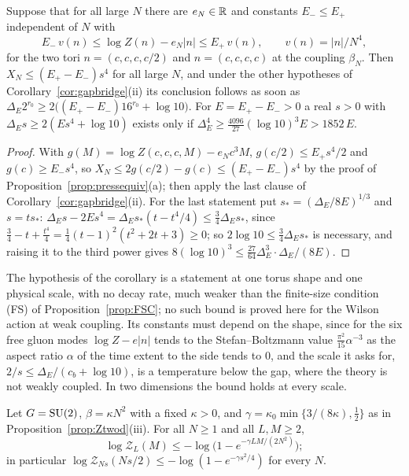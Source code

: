 \begin{corollary}\label{cor:pressuv}
Suppose that for all large $N$ there are $e_N\in\mathbb{R}$ and constants $E_-\le E_+$
independent of $N$ with
\[
E_-\,v(n)\le\log Z(n)-e_N|n|\le E_+\,v(n),\qquad v(n)=|n|/N^4,
\]
for the two tori $n=(c,c,c,c/2)$ and $n=(c,c,c,c)$ at the coupling $\beta_N$.
Then $X_N\le(E_+-E_-)s^4$ for all large $N$, and under the other hypotheses of
Corollary~\ref{cor:gapbridge}(ii) its conclusion follows as soon as $\Delta_E
2^{r_0}\ge2\bigl((E_+-E_-)16^{r_0}+\log10\bigr)$. For $E=E_+-E_->0$ a real
$s>0$ with $\Delta_Es\ge2(Es^4+\log10)$ exists only if $\Delta_E^4\ge\frac
{4096}{27}(\log10)^3E>1852\,E$.
\end{corollary}

\begin{proof}
With $g(M)=\log Z(c,c,c,M)-e_Nc^3M$, $g(c/2)\le E_+s^4/2$ and $g(c)\ge E_-s^4$,
so $X_N\le2g(c/2)-g(c)\le(E_+-E_-)s^4$ by the proof of
Proposition~\ref{prop:pressequiv}(a); then apply the last clause of
Corollary~\ref{cor:gapbridge}(ii). For the last statement put $s_*=(\Delta_E/
8E)^{1/3}$ and $s=ts_*$: $\Delta_Es-2Es^4=\Delta_Es_*(t-t^4/4)\le\frac34
\Delta_Es_*$, since $\frac34-t+\frac{t^4}4=\frac14(t-1)^2(t^2+2t+3)\ge0$; so
$2\log10\le\frac34\Delta_Es_*$ is necessary, and raising it to the third power
gives $8(\log10)^3\le\frac{27}{64}\Delta_E^3\cdot\Delta_E/(8E)$.
\end{proof}

The hypothesis of the corollary is a statement at one torus shape and one
physical scale, with no decay rate, much weaker than the finite-size
condition (FS) of Proposition~\ref{prop:FSC}; no such bound is proved here
for the Wilson action at weak coupling. Its constants must depend on the
shape, since for the six free gluon modes $\log Z-e|n|$ tends to the
Stefan--Boltzmann value $\frac{\pi^2}{15}\alpha^{-3}$ as the aspect ratio
$\alpha$ of the time extent to the side tends to $0$, and the scale
it asks for, $2/s\le\Delta_E/(c_b+\log10)$, is a temperature below the gap,
where the theory is not weakly coupled. In two dimensions the bound holds at
every scale.

\begin{proposition}\label{prop:presstwod}
Let $G=\mathrm{SU}(2)$, $\beta=\kappa N^2$ with a fixed $\kappa>0$, and $\gamma=\kappa_0
\min\{3/(8\kappa),\frac12\}$ as in Proposition~\ref{prop:Ztwod}(iii). For all
$N\ge1$ and all $L,M\ge2$,
\[
\log\mathcal Z_L(M)\le-\log\bigl(1-e^{-\gamma LM/(2N^2)}\bigr);
\]
in particular $\log\mathcal Z_{Ns}(Ns/2)\le-\log(1-e^{-\gamma s^2/4})$ for every
$N$.
\end{proposition}

